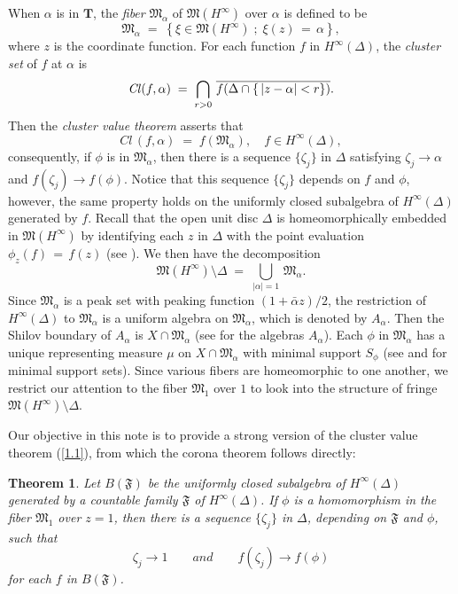 \documentclass[12pt]{amsart}
\theoremstyle{plain}
\newtheorem*{theo}{Theorem}
\numberwithin{equation}{section}
\begin{document}
When $\alpha$ is in ${\mathbf{T}}$, the {\it fiber\/} $\mathfrak{M}_{\alpha}$ of $\mathfrak{M}(H^\infty)$  over $\alpha$ is defined to be
$$
\mathfrak{M}_{\alpha}\;=\;\left\{\xi\in \mathfrak{M}(H^\infty) \;; \; \xi(z)\,=\,\alpha \right\},
$$
where $z$ is the coordinate function. For each function $f$ in $H^\infty(\Delta)$,
the \textit{cluster set} of $f$ at $\alpha$ is
$$
{\it Cl}(f,\alpha)\;=\;\bigcap_{r>0}\,\overline{f(\Delta\cap \{\,\vert z-\alpha\vert < r\})}.
$$
Then the \textit{cluster value theorem} asserts that
\begin{equation}
\textit{Cl}\,(f,\alpha)\;=\;f(\mathfrak{M}_{\alpha}), \quad f \in H^\infty(\Delta),
\label{1.1}
\end{equation}
consequently, if $\phi$ is in $\mathfrak{M}_{\alpha}$, then
there is a sequence $\{\zeta_j\}$ in $\Delta$ satisfying
$\zeta_j \rightarrow \alpha$ and $f(\zeta_j) \rightarrow f(\phi)$.
Notice that this sequence $\{\zeta_j\}$ depends on $f$ and $\phi$,
however, the same property holds on the uniformly closed subalgebra of $H^\infty(\Delta)$ generated by $f$.
Recall that the open unit disc $\Delta$ is homeomorphically embedded in
$\mathfrak{M}(H^\infty)$ by identifying each $z$ in $\Delta$
with the point evaluation $\phi_z(f)\,=\,f(z)$
(see \cite[Chapter 10]{H}).
We then have the decomposition
$$
\mathfrak{M}(H^\infty)\setminus \Delta\;=\;\bigcup_{\vert\alpha\vert = 1}\,
\mathfrak{M}_{\alpha} .
$$
Since $\mathfrak{M}_{\alpha}$ is a peak set
with peaking function $(1+\bar{\alpha}z)/2$, the restriction of $H^\infty(\Delta)$ to
$\mathfrak{M}_{\alpha}$ is a uniform algebra on $\mathfrak{M}_{\alpha}$, which is denoted by $A_\alpha$. Then the Shilov boundary of $A_\alpha$ is $X\cap \mathfrak{M}_{\alpha}$ (see \cite[187p - 193p]{H} for
the algebras $A_\alpha$). Each $\phi$ in $\mathfrak{M}_\alpha$
has a unique representing measure $\mu$ on $X\cap \mathfrak{M}_{\alpha}$ with minimal support $S_{\phi}$ (see \cite[Chapter II, Theorem 2.3]{G1} and
 \cite[Chapter 10, Exercise 4]{H} for minimal support sets).
Since various fibers are homeomorphic to one another,
we restrict our attention to the fiber
$\mathfrak{M}_1$ over $1$ to look into the structure of fringe
$\mathfrak{M}(H^\infty)\setminus \Delta$.

\medskip
Our objective in this note is to provide a strong version of the cluster value theorem (\ref{1.1}), from which the corona theorem follows directly:
\begin{theo}
\label{theo}
Let $B(\mathfrak{F})$ be the uniformly closed subalgebra of $H^\infty(\Delta)$ generated by a countable family $\mathfrak{F}$
of $H^\infty(\Delta)$. If $\phi$ is a homomorphism in the fiber $\mathfrak{M}_1$ over $z=1$, then there is a sequence
 $\{\zeta_j\}$ in $\Delta$, depending on $\mathfrak{F}$ and $\phi$, such that
\begin{equation}
\label{eq1.2}
\zeta_j \rightarrow 1 \qquad
and \qquad f(\zeta_j) \rightarrow f(\phi)
\end{equation}
for each $f$ in
$B(\mathfrak{F})$.
\end{theo}
\end{document}
